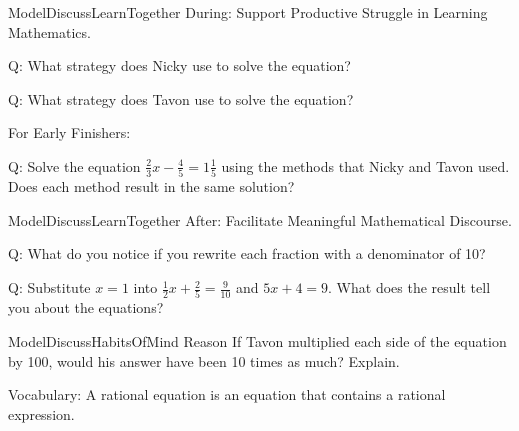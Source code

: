 \documentclass{article}
\newenvironment{concept-box}{}{}        %
\newenvironment{te-addendum}[2]{}{}     %
\newcommand{\answer}[1]{}               %
\begin{document}
\begin{te-addendum}{ModelDiscuss}{LearnTogether}
During: Support Productive Struggle in Learning Mathematics.

Q: What strategy does Nicky use to solve the equation?
\answer{Nicky uses a similar strategy as she would use to solve a linear equation with integers. She subtracts to isolate the variable term on one side of the equation; then she divides to isolate the variable.}

Q: What strategy does Tavon use to solve the equation?
\answer{Tavon multiplies each side of the equation by 10. Because each side of the equation is multiplied by the same value, the result is an equivalent equation.}

For Early Finishers:

Q: Solve the equation $\frac{2}{3}x-\frac{4}{5}=1\frac{1}{5}$ using the methods that Nicky and Tavon used. Does each method result in the same solution?
\answer{The solution is $x=3$. Each method of solving this problem results in the same answer.}
\end{te-addendum}

\begin{te-addendum}{ModelDiscuss}{LearnTogether}
After: Facilitate Meaningful Mathematical Discourse.

Q: What do you notice if you rewrite each fraction with a denominator of 10?
\answer{The numerators are the same as those in the equation that Tavon found after multiplying both sides of the equation by 10.}

Q: Substitute $x=1$ into $\frac{1}{2}x+\frac{2}{5}=\frac{9}{10}$ and $5x+4=9$. What does the result tell you about the equations?
\answer{When you substitute $x=1$ in both equations, the equations are true. These are equivalent equations.}
\end{te-addendum}

\begin{te-addendum}{ModelDiscuss}{HabitsOfMind}
Reason If Tavon multiplied each side of the equation by 100, would his answer have been 10 times as much? Explain.
\answer{No; multiplying each side of an equation by the same value does not change the solution of the equation.}
\end{te-addendum}

\begin{concept-box}
Vocabulary: A rational equation is an equation that contains a rational expression.
\end{concept-box}
\end{document}
